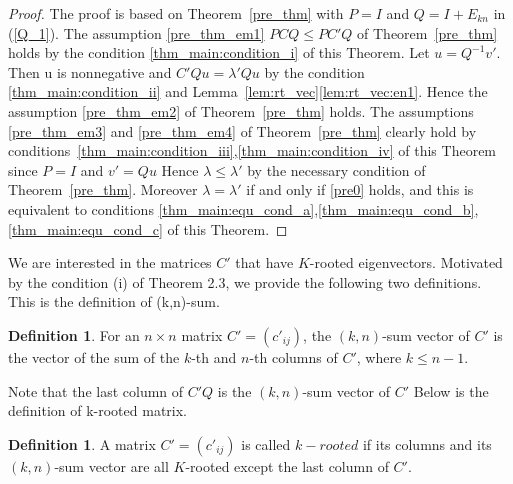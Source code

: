 \documentclass{article}
\theoremstyle{plain}
\theoremstyle{definition}
\newtheorem{defn}[thm]{Definition}
\begin{document}
   
\begin{proof}
    The proof is based on Theorem~\ref{pre_thm} with $P = I$ and $Q = I + E_{kn}$ in (\ref{Q_1}). 
    The assumption \ref{pre_thm_em1} $PCQ\leq PC'Q$ of Theorem~\ref{pre_thm} holds by the condition \ref{thm_main:condition_i} of this Theorem. 
    Let $u = Q^{-1}v'$. Then u is nonnegative and $C'Qu = \lambda' Qu$ by the condition \ref{thm_main:condition_ii} and
     Lemma~\ref{lem:rt_vec}\ref{lem:rt_vec:en1}. Hence the assumption \ref{pre_thm_em2} of Theorem~\ref{pre_thm} holds. The assumptions \ref{pre_thm_em3} and \ref{pre_thm_em4}
      of Theorem~\ref{pre_thm} clearly hold by conditions~\ref{thm_main:condition_iii},\ref{thm_main:condition_iv} of this Theorem since $P = I$ and
       $v'= Qu$  Hence $\lambda \leq \lambda' $ by the necessary condition of Theorem~\ref{pre_thm}. Moreover
        $\lambda = \lambda'$ if and only if \ref{pre0} holds, and this is equivalent to
         conditions \ref{thm_main:equ_cond_a},\ref{thm_main:equ_cond_b},\ref{thm_main:equ_cond_c} of this Theorem. 
\end{proof}   
    
We are interested in the matrices $C'$ that have $K$-rooted eigenvectors.
Motivated by the condition (i) of Theorem 2.3, we provide the following two definitions. 
This is the definition of (k,n)-sum.
\begin{defn}
    For an $n \times n$ matrix $C'=(c'_{ij})$, the $(k, n)$-sum vector of $C'$ is the vector of the sum of the $k$-th and  $n$-th columns of $C'$, where $k\leq n-1$.
\end{defn}

Note that the last column of $C'Q$ is the $(k, n)$-sum vector of $C'$
Below is the definition of k-rooted matrix.
\begin{defn}\label{m_rooted}
    A  matrix $C'=(c'_{ij})$ is called $k-rooted$  if its  columns and its $(k, n)$-sum vector are all $K$-rooted except the last column of $C'$.
\end{defn}
\end{document}
